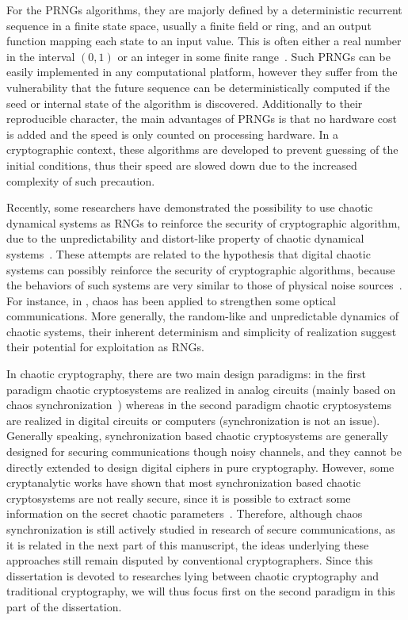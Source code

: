For the PRNGs algorithms, they are majorly defined by a deterministic recurrent sequence in a finite state space, usually a finite field or ring, and an output function mapping each state to an input value. This is often either a real number in the interval $(0,1)$ or an integer in some finite range~\cite{LEcuyer08}. Such PRNGs can be easily implemented in any computational platform, however they suffer from the vulnerability that the future sequence can be deterministically computed if the seed or internal state of the algorithm is discovered. Additionally to their reproducible character, the main advantages of PRNGs is that no hardware cost is added and the speed is only counted on processing hardware. In 
a cryptographic context, these algorithms are developed to prevent guessing of the initial conditions, thus their speed are slowed down due to the increased complexity of such precaution.

Recently, some researchers have demonstrated the possibility to use chaotic dynamical systems as RNGs to reinforce the security of cryptographic algorithm, due to the unpredictability and distort-like property of chaotic dynamical systems~\cite{Falcioni2005,Cecen2009,PO2004}. These attempts are related to the hypothesis that digital chaotic systems can possibly reinforce the security of cryptographic algorithms, because the behaviors of such systems are very similar to those of physical noise sources~\cite{Schuster1984}. For instance, in \cite{cite-key}, chaos has been applied to strengthen some optical communications. More generally, the random-like and unpredictable dynamics of chaotic systems, their inherent determinism and simplicity of realization suggest their potential for exploitation as RNGs.

In chaotic cryptography, there are two main design paradigms: in the first paradigm chaotic cryptosystems are realized in analog circuits (mainly based on chaos synchronization~\cite{PhysRevLett.64.821}) whereas in the second paradigm chaotic cryptosystems are realized in digital circuits or computers (synchronization is not an issue). Generally speaking, synchronization based chaotic cryptosystems are generally designed for securing communications though noisy channels, and they cannot be directly extended to design digital ciphers in pure cryptography. However, some cryptanalytic works have shown that most synchronization based chaotic cryptosystems are not really secure, since it is possible to extract some information on the secret chaotic parameters~\cite{BethLaMa94}. Therefore, although chaos synchronization is still actively studied in research of secure communications, as it is related in the next part
of this manuscript, the ideas underlying these approaches still remain disputed by conventional cryptographers. Since this dissertation is devoted to researches lying between chaotic cryptography and traditional cryptography, we will thus focus first on the second paradigm in this part of the dissertation. 

